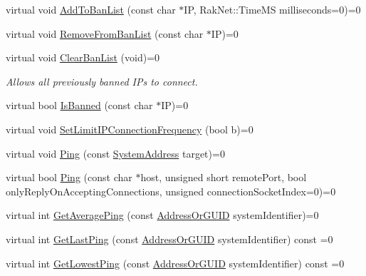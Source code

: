\begin{DoxyCompactItemize}
\item 
virtual void \hyperlink{class_rak_net_1_1_rak_peer_interface_ab44199db81cf4fa834d42efc5eb5ae77}{Add\-To\-Ban\-List} (const char $\ast$I\-P, Rak\-Net\-::\-Time\-M\-S milliseconds=0)=0
\item 
virtual void \hyperlink{class_rak_net_1_1_rak_peer_interface_a9e18c8dae14157432ddc6f19a8114c1b}{Remove\-From\-Ban\-List} (const char $\ast$I\-P)=0
\item 
\hypertarget{class_rak_net_1_1_rak_peer_interface_a79afdfa5e5e87e66dc54b3336a30b68a}{virtual void \hyperlink{class_rak_net_1_1_rak_peer_interface_a79afdfa5e5e87e66dc54b3336a30b68a}{Clear\-Ban\-List} (void)=0}\label{class_rak_net_1_1_rak_peer_interface_a79afdfa5e5e87e66dc54b3336a30b68a}

\begin{DoxyCompactList}\small\item\em Allows all previously banned I\-Ps to connect. \end{DoxyCompactList}\item 
virtual bool \hyperlink{class_rak_net_1_1_rak_peer_interface_ae28629f202de81ad4816470cd0f8fd94}{Is\-Banned} (const char $\ast$I\-P)=0
\item 
virtual void \hyperlink{class_rak_net_1_1_rak_peer_interface_a1c7d098a1d9a4613f051ae3627831af6}{Set\-Limit\-I\-P\-Connection\-Frequency} (bool b)=0
\item 
virtual void \hyperlink{class_rak_net_1_1_rak_peer_interface_a49dbff7ab8f516361e3d05645c2b7901}{Ping} (const \hyperlink{struct_rak_net_1_1_system_address}{System\-Address} target)=0
\item 
virtual bool \hyperlink{class_rak_net_1_1_rak_peer_interface_ad5667c9d47585be3a65485f9c81f7045}{Ping} (const char $\ast$host, unsigned short remote\-Port, bool only\-Reply\-On\-Accepting\-Connections, unsigned connection\-Socket\-Index=0)=0
\item 
virtual int \hyperlink{class_rak_net_1_1_rak_peer_interface_a15627acab7077970975889d4e83dc59b}{Get\-Average\-Ping} (const \hyperlink{struct_rak_net_1_1_address_or_g_u_i_d}{Address\-Or\-G\-U\-I\-D} system\-Identifier)=0
\item 
virtual int \hyperlink{class_rak_net_1_1_rak_peer_interface_a0fb0115e5c85094d48239f157d9eccbb}{Get\-Last\-Ping} (const \hyperlink{struct_rak_net_1_1_address_or_g_u_i_d}{Address\-Or\-G\-U\-I\-D} system\-Identifier) const =0
\item 
virtual int \hyperlink{class_rak_net_1_1_rak_peer_interface_a4eb8b0f288db5425906cd72ee5f8fae9}{Get\-Lowest\-Ping} (const \hyperlink{struct_rak_net_1_1_address_or_g_u_i_d}{Address\-Or\-G\-U\-I\-D} system\-Identifier) const =0

\end{DoxyCompactItemize}
